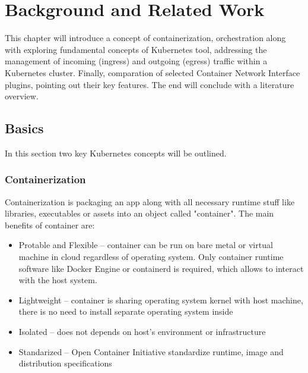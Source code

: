 \chapter{Background and Related Work}
\label{cha:background}

This chapter will introduce a concept of containerization, orchestration along with exploring fundamental concepts of Kubernetes tool, addressing the management of incoming (ingress) and outgoing (egress) traffic within a Kubernetes cluster. Finally, comparation of selected Container Network Interface plugins, pointing out their key features. The end will conclude with a literature overview.


\section{Basics}
\label{sec:basics}

In this section two key Kubernetes concepts will be outlined.

\subsection{Containerization}
\label{sec:containerization}

Containerization is packaging an app along with all necessary runtime stuff like libraries, executables or assets into an object called "container". The main benefits of container are\cite{RedhatContainerization}: 

\begin{itemize} 
    \item Protable and Flexible -- container can be run on bare metal or virtual machine in cloud regardless of operating system. Only container runtime software like Docker Engine or containerd is required, which allows to interact with the host system. 

    \item Lightweight -- container is sharing operating system kernel with host machine, there is no need to install separate operating system inside 

    \item Isolated -- does not depends on host's environment or infrastructure 

    \item Standarized -- Open Container Initiative standardize runtime, image and distribution specifications 

\end{itemize} 


